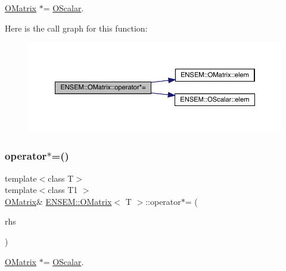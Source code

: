 \mbox{\hyperlink{classENSEM_1_1OMatrix}{O\+Matrix}} $\ast$= \mbox{\hyperlink{classENSEM_1_1OScalar}{O\+Scalar}}. 

Here is the call graph for this function\+:
\nopagebreak
\begin{figure}[H]
\begin{center}
\leavevmode
\includegraphics[width=350pt]{dd/d80/classENSEM_1_1OMatrix_a40e18b83c9eb609f7529e65c515010c2_cgraph}
\end{center}
\end{figure}
\mbox{\label{classENSEM_1_1OMatrix_a40e18b83c9eb609f7529e65c515010c2}} 
\subsubsection{\texorpdfstring{operator$\ast$=()}{operator*=()}\hspace{0.1cm}{\footnotesize\ttfamily [3/3]}}
{\footnotesize\ttfamily template$<$class T$>$ \\
template$<$class T1 $>$ \\
\mbox{\hyperlink{classENSEM_1_1OMatrix}{O\+Matrix}}\& \mbox{\hyperlink{classENSEM_1_1OMatrix}{E\+N\+S\+E\+M\+::\+O\+Matrix}}$<$ T $>$\+::operator$\ast$= (\begin{DoxyParamCaption}\item[{const \mbox{\hyperlink{classENSEM_1_1OScalar}{O\+Scalar}}$<$ T1 $>$ \&}]{rhs }\end{DoxyParamCaption})\hspace{0.3cm}{\ttfamily [inline]}}



\mbox{\hyperlink{classENSEM_1_1OMatrix}{O\+Matrix}} $\ast$= \mbox{\hyperlink{classENSEM_1_1OScalar}{O\+Scalar}}. 

